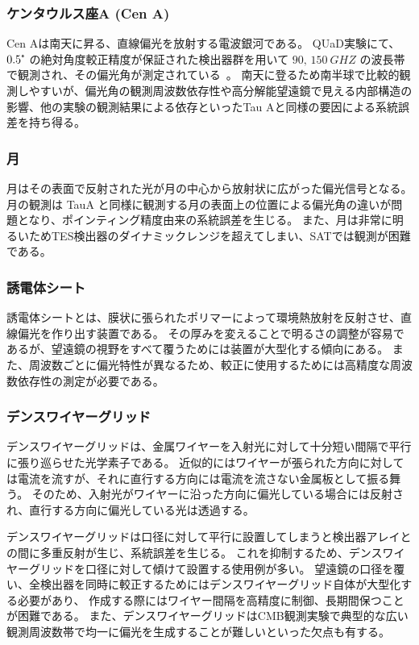 \documentclass[../../main.tex]{subfiles}
\begin{document}
\subsubsection{ケンタウルス座A (Cen A)}
Cen Aは南天に昇る、直線偏光を放射する電波銀河である。
QUaD実験にて、$0.5\tcdegree$ の絶対角度較正精度が保証された検出器群を用いて $90,\,\SI{150}{GHZ}$ の波長帯で観測され、その偏光角が測定されている~\cite{so:Zemcov_2010}。
南天に登るため南半球で比較的観測しやすいが、偏光角の観測周波数依存性や高分解能望遠鏡で見える内部構造の影響、他の実験の観測結果による依存といったTau Aと同様の要因による系統誤差を持ち得る。
\subsubsection{月}
月はその表面で反射された光が月の中心から放射状に広がった偏光信号となる。
月の観測は TauA と同様に観測する月の表面上の位置による偏光角の違いが問題となり、ポインティング精度由来の系統誤差を生じる。
また、月は非常に明るいためTES検出器のダイナミックレンジを超えてしまい、SATでは観測が困難である。
\subsubsection{誘電体シート}
誘電体シートとは、膜状に張られたポリマーによって環境熱放射を反射させ、直線偏光を作り出す装置である。
その厚みを変えることで明るさの調整が容易であるが、望遠鏡の視野をすべて覆うためには装置が大型化する傾向にある。
また、周波数ごとに偏光特性が異なるため、較正に使用するためには高精度な周波数依存性の測定が必要である。

\subsubsection{デンスワイヤーグリッド}
デンスワイヤーグリッドは、金属ワイヤーを入射光に対して十分短い間隔で平行に張り巡らせた光学素子である。
近似的にはワイヤーが張られた方向に対しては電流を流すが、それに直行する方向には電流を流さない金属板として振る舞う。
そのため、入射光がワイヤーに沿った方向に偏光している場合には反射され、直行する方向に偏光している光は透過する。

デンスワイヤーグリッドは口径に対して平行に設置してしまうと検出器アレイとの間に多重反射が生じ、系統誤差を生じる。
これを抑制するため、デンスワイヤーグリッドを口径に対して傾けて設置する使用例が多い。
望遠鏡の口径を覆い、全検出器を同時に較正するためにはデンスワイヤーグリッド自体が大型化する必要があり、
作成する際にはワイヤー間隔を高精度に制御、長期間保つことが困難である。
また、デンスワイヤーグリッドはCMB観測実験で典型的な広い観測周波数帯で均一に偏光を生成することが難しいといった欠点も有する。
\end{document}
